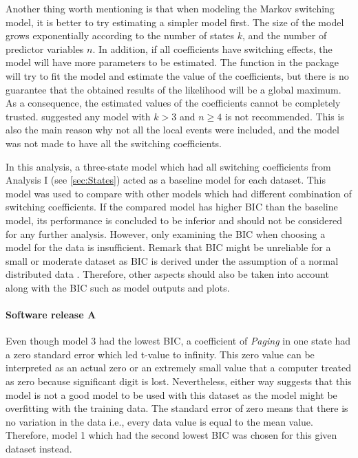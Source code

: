 Another thing worth mentioning is that when modeling the Markov switching
model, it is better to try estimating a simpler model first. The size
of the model grows exponentially according to the number of states
$k$, and the number of predictor variables $n$. In addition, if
all coefficients have switching effects, the model will have more
parameters to be estimated. The function in the package will try to
fit the model and estimate the value of the coefficients, but there
is no guarantee that the obtained results of the likelihood will be
a global maximum. As a consequence, the estimated values of the coefficients
cannot be completely trusted. \citet{perlin2015ms_regress} suggested
any model with $k>3$ and $n\geq4$ is not recommended. This is also
the main reason why not all the local events were included, and the
model was not made to have all the switching coefficients. 

In this analysis, a three-state model which had all switching coefficients
from Analysis I (see \ref{sec:States}) acted as a baseline model
for each dataset. This model was used to compare with other models
which had different combination of switching coefficients. If the
compared model has higher BIC than the baseline model, its performance
is concluded to be inferior and should not be considered for any further
analysis. However, only examining the BIC when choosing a model for
the data is insufficient. Remark that BIC might be unreliable for
a small or moderate dataset as BIC is derived under the assumption
of a normal distributed data \citep{ryden2008versus}. Therefore,
other aspects should also be taken into account along with the BIC
such as model outputs and plots. 

\paragraph*{Software release A}

Even though model 3 had the lowest BIC, a coefficient of \emph{Paging}
in one state had a zero standard error which led t-value to infinity.
This zero value can be interpreted as an actual zero or an extremely
small value that a computer treated as zero because significant digit
is lost. Nevertheless, either way suggests that this model is not
a good model to be used with this dataset as the model might be overfitting
with the training data. The standard error of zero means that there
is no variation in the data i.e., every data value is equal to the
mean value. Therefore, model 1 which had the second lowest BIC was
chosen for this given dataset instead. %
\begin{comment}
The t statistic is the coefficient divided by its standard error.
The standard error is an estimate of the standard deviation of the
coefficient, the amount it varies across cases. It can be thought
of as a measure of the precision with which the regression coefficient
is measured. If a coefficient is large compared to its standard error,
then it is probably different from 0.
\end{comment}


